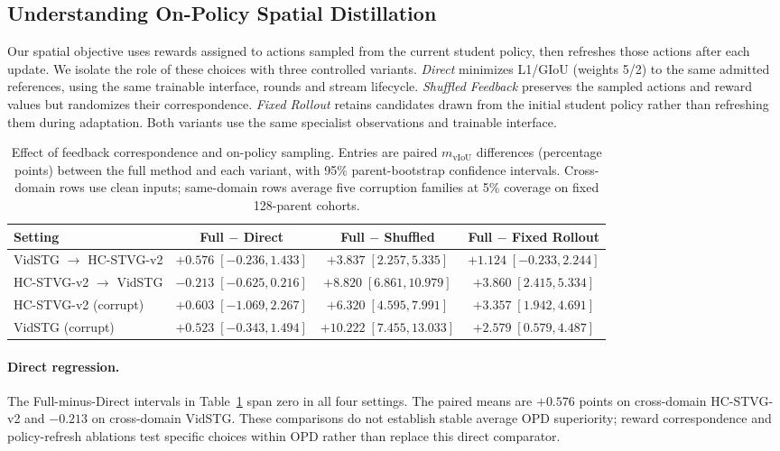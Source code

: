 \documentclass[10pt,twocolumn,letterpaper]{article}
\newcommand{\mvIoU}{\ensuremath{m_{\mathrm{vIoU}}}}
\begin{document}
\subsection{Understanding On-Policy Spatial Distillation}
\label{sec:opd-ablation}

Our spatial objective uses rewards assigned to actions
sampled from the current student policy, then refreshes
those actions after each update. We isolate the role of
these choices with three controlled variants. \emph{Direct}
minimizes L1/GIoU (weights 5/2) to the same admitted references,
using the same trainable interface, rounds and stream lifecycle. \emph{Shuffled
	Feedback} preserves the sampled actions and reward values
but randomizes their correspondence. \emph{Fixed Rollout}
retains candidates drawn from the initial student policy
rather than refreshing them during adaptation. Both variants
use the same specialist observations and trainable interface.

\begin{table}[t]
	\centering
	\caption{Effect of feedback correspondence and on-policy
		sampling. Entries are paired \mvIoU{} differences (percentage
		points) between the full method and each variant, with 95\%
		parent-bootstrap confidence intervals. Cross-domain rows
		use clean inputs; same-domain rows average five corruption
		families at 5\% coverage on fixed 128-parent cohorts.}
	\label{tab:opd-ablation}
	\setlength{\tabcolsep}{5pt}
	\small
	\begin{tabular}{lccc}
		\toprule
		Setting & Full $-$ Direct & Full $-$ Shuffled & Full $-$ Fixed Rollout \\
		\midrule
		VidSTG $\rightarrow$ HC-STVG-v2
		& $+0.576\;[-0.236,1.433]$ & $+3.837\;[2.257,5.335]$ & $+1.124\;[-0.233,2.244]$ \\
		HC-STVG-v2 $\rightarrow$ VidSTG
		& $-0.213\;[-0.625,0.216]$ & $+8.820\;[6.861,10.979]$ & $+3.860\;[2.415,5.334]$ \\
		HC-STVG-v2 (corrupt)
		& $+0.603\;[-1.069,2.267]$ & $+6.320\;[4.595,7.991]$ & $+3.357\;[1.942,4.691]$ \\
		VidSTG (corrupt)
		& $+0.523\;[-0.343,1.494]$ & $+10.222\;[7.455,13.033]$ & $+2.579\;[0.579,4.487]$ \\
		\bottomrule
	\end{tabular}
\end{table}

\paragraph{Direct regression.}
The Full-minus-Direct intervals in Table~\ref{tab:opd-ablation}
span zero in all four settings. The paired means are $+0.576$
points on cross-domain HC-STVG-v2 and $-0.213$ on cross-domain
VidSTG. These comparisons do not establish stable average OPD
superiority; reward correspondence and policy-refresh ablations test
specific choices within OPD rather than replace this direct comparator.
\end{document}
